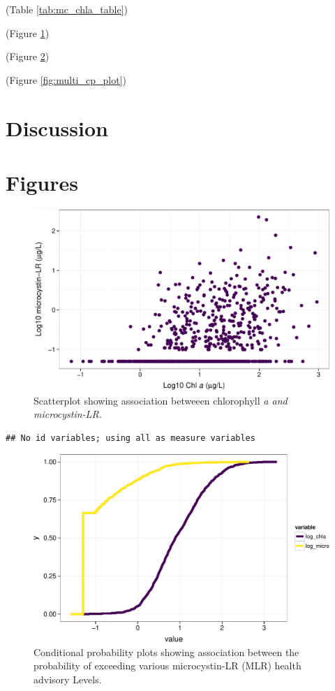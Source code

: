 \documentclass[11pt,]{article}
\begin{document}
(Table \ref{tab:mc_chla_table})

(Figure \ref{fig:chla_micro_scatter})

(Figure \ref{fig:chla_micro_cdf})

(Figure \ref{fig:multi_cp_plot})

\section{Discussion}\label{discussion}

\section{Figures}\label{figures}

\begin{figure}[htbp]
\centering
\includegraphics{manuscript_files/figure-latex/chla_micro_scatter-1.pdf}
\caption{Scatterplot showing association betweeen chlorophyll
\it{a} and microcystin-LR. \label{fig:chla_micro_scatter}}
\end{figure}

\newpage

\begin{verbatim}
## No id variables; using all as measure variables
\end{verbatim}

\begin{figure}[htbp]
\centering
\includegraphics{manuscript_files/figure-latex/chla_micro_cdf-1.pdf}
\caption{Conditional probability plots showing association between the
probability of exceeding various microcystin-LR (MLR) health advisory
Levels. \label{fig:chla_micro_cdf}}
\end{figure}
\end{document}
